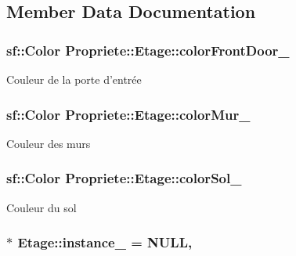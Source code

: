 \subsection{Member Data Documentation}
\hypertarget{classPropriete_1_1Etage_aed705b529fa3791aee28bdfeaeab316b}{
\subsubsection[{color\-Front\-Door\-\_\-}]{\setlength{\rightskip}{0pt plus 5cm}sf\-::\-Color Propriete\-::\-Etage\-::color\-Front\-Door\-\_\-\hspace{0.3cm}{\ttfamily [private]}}}\label{classPropriete_1_1Etage_aed705b529fa3791aee28bdfeaeab316b}
Couleur de la porte d'entrée \hypertarget{classPropriete_1_1Etage_ae4d22f4c2da0d0283a05865e177613a5}{
\subsubsection[{color\-Mur\-\_\-}]{\setlength{\rightskip}{0pt plus 5cm}sf\-::\-Color Propriete\-::\-Etage\-::color\-Mur\-\_\-\hspace{0.3cm}{\ttfamily [private]}}}\label{classPropriete_1_1Etage_ae4d22f4c2da0d0283a05865e177613a5}
Couleur des murs \hypertarget{classPropriete_1_1Etage_a5021151f3c576104c8e69288c4d20acc}{
\subsubsection[{color\-Sol\-\_\-}]{\setlength{\rightskip}{0pt plus 5cm}sf\-::\-Color Propriete\-::\-Etage\-::color\-Sol\-\_\-\hspace{0.3cm}{\ttfamily [private]}}}\label{classPropriete_1_1Etage_a5021151f3c576104c8e69288c4d20acc}
Couleur du sol \hypertarget{classPropriete_1_1Etage_a18488d57f181ec2c2c01ff132ffe98fa}{
\subsubsection[{instance\-\_\-}]{ $\ast$ Etage\-::instance\-\_\- = N\-U\-L\-L\hspace{0.3cm}{\ttfamily [static]}, {\ttfamily [private]}}}\label{classPropriete_1_1Etage_a18488d57f181ec2c2c01ff132ffe98fa}
